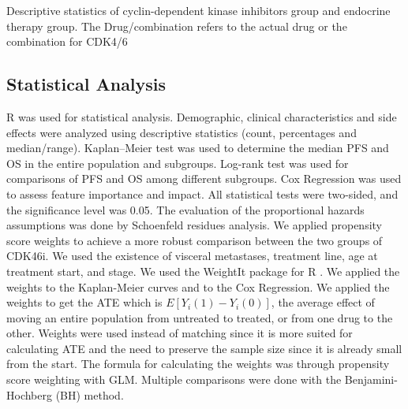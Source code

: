  
\begin{table}
\caption{Descriptive statistics of cyclin-dependent kinase inhibitors group and endocrine therapy group. The Drug/combination refers to the actual drug or the combination for CDK4/6}
\centering
\label{tab:stats_ipop_cdk}

\end{table}




\subsection{Statistical Analysis}
R was used for statistical analysis. Demographic, clinical characteristics and side effects were analyzed using descriptive statistics (count, percentages and median/range). Kaplan–Meier test was used to determine the median PFS and OS in the entire population and subgroups. Log-rank test was used for comparisons of PFS and OS among different subgroups. Cox Regression was used to assess feature importance and impact. All statistical tests were two-sided, and the significance level was 0.05. The evaluation of the proportional hazards assumptions was done by Schoenfeld residues analysis.
We applied propensity score weights to achieve a more robust comparison between the two groups of CDK4\/6i. We used the existence of visceral metastases, treatment line, age at treatment start, and stage. We used the WeightIt package for R \cite{WeightIt}. We applied the weights to the Kaplan-Meier curves and to the Cox Regression. We applied the weights to get the ATE which is $E[Y_i(1)-Y_i(0)]$, the average effect of moving an entire population from untreated to treated, or from one drug to the other. Weights were used instead of matching since it is more suited for calculating ATE and the need to preserve the sample size since it is already small from the start. The formula for calculating the weights was through propensity score weighting with GLM. Multiple comparisons were done with the Benjamini-Hochberg (BH) method. 




